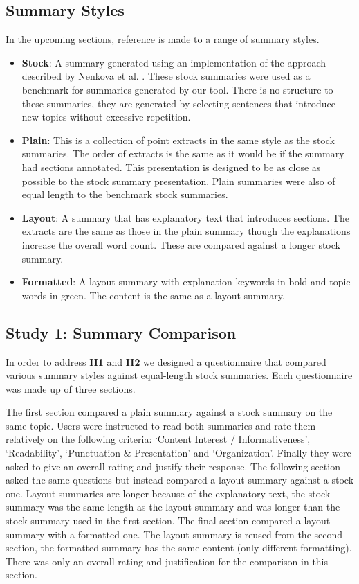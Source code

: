     \tocless\subsection{Summary Styles}
      In the upcoming sections, reference is made to a range of summary styles.
      \begin{itemize}
        \item{\textbf{Stock}: A summary generated using an implementation of the approach described by Nenkova et al. \cite{nenkova2006compositional}. These stock summaries were used as a benchmark for summaries generated by our tool. There is no structure to these summaries, they are generated by selecting sentences that introduce new topics without excessive repetition.}
        \item{\textbf{Plain}: This is a collection of point extracts in the same style as the stock summaries. The order of extracts is the same as it would be if the summary had sections annotated. This presentation is designed to be as close as possible to the stock summary presentation. Plain summaries were also of equal length to the benchmark stock summaries.}
        \item{\textbf{Layout}: A summary that has explanatory text that introduces sections. The extracts are the same as those in the plain summary though the explanations increase the overall word count. These are compared against a longer stock summary.}
        \item{\textbf{Formatted}: A layout summary with explanation keywords in bold and topic words in green. The content is the same as a layout summary.}
      \end{itemize}

    \tocless\subsection{Study 1: Summary Comparison\label{sec:stud1}}
      In order to address \textbf{H1} and \textbf{H2} we designed a questionnaire that compared various summary styles against equal-length stock summaries. Each questionnaire was made up of three sections.

      The first section compared a plain summary against a stock summary on the same topic. Users were instructed to read both summaries and rate them relatively on the following criteria: `Content Interest / Informativeness', `Readability', `Punctuation \& Presentation' and `Organization'. Finally they were asked to give an overall rating and justify their response. The following section asked the same questions but instead compared a layout summary against a stock one. Layout summaries are longer because of the explanatory text, the stock summary was the same length as the layout summary and was longer than the stock summary used in the first section. The final section compared a layout summary with a formatted one. The layout summary is reused from the second section, the formatted summary has the same content (only different formatting). There was only an overall rating and justification for the comparison in this section.

